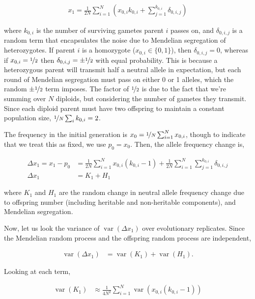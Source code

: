 \documentclass[11pt]{article}
\DeclareMathOperator{\var}{var}
\begin{document}
\begin{align}
  x_1 = \frac{1}{2N} \sum_{i=1}^N \left( x_{0,i}k_{0,i} + \sum_{j=1}^{k_{0,i}} \delta_{0,i,j} \right)
\end{align}

where $k_{0,i}$ is the number of surviving gametes parent $i$ passes on, and
$\delta_{0,i,j}$ is a random term that encapsulates the noise due to Mendelian
segregation of heterozygotes. If parent $i$ is a homozygote ($x_{0,i} \in \{0,
1\}$), then $\delta_{0,i,j} = 0$, whereas if $x_{0,i} = \nicefrac{1}{2}$ then
$\delta_{0,i,j} = \pm \nicefrac{1}{2}$ with equal probability. This is because
a heterozygous parent will transmit half a neutral allele in expectation, but
each round of Mendelian segregation must pass on either 0 or 1 alleles, which
the random $\pm \nicefrac{1}{2}$ term imposes. The factor of $\nicefrac{1}{2}$
is due to the fact that we're summing over $N$ diploids, but considering the
number of gametes they transmit. Since each diploid parent must have two
offspring to maintain a constant population size, $\nicefrac{1}{N} \sum_i
k_{0,i} = 2$. 

The frequency in the initial generation is $x_0 = \nicefrac{1}{N} \sum_{i=1}^N
x_{0,i}$, though to indicate that we treat this as fixed, we use $p_0 = x_0$.
Then, the allele frequency change is,

\begin{align}
  \Delta x_1 = x_1 - p_0 &= \frac{1}{2N} \sum_{i=1}^N x_{0,i} (k_{0,i} - 1) + \frac{1}{2N} \sum_{i=1}^N \sum_{j=1}^{k_{0,i}} \delta_{0,i,j} \\
  \Delta x_1 &= K_1 + H_1
\end{align}

where $K_1$ and $H_1$ are the random change in neutral allele frequency change
due to offspring number (including heritable and non-heritable components), and
Mendelian segregation.

Now, let us look the variance of $\var(\Delta x_1)$ over evolutionary
replicates. Since the Mendelian random process and the offspring random process
are independent,

\begin{align}
  \var(\Delta x_1) &= \var(K_1) + \var(H_1).
\end{align}

Looking at each term,

\begin{align}
  \var(K_1) &\approx \frac{1}{4N^2} \sum_{i=1}^N \var\left(x_{0,i} (k_{0,i} - 1) \right)
\end{align}
\end{document}
